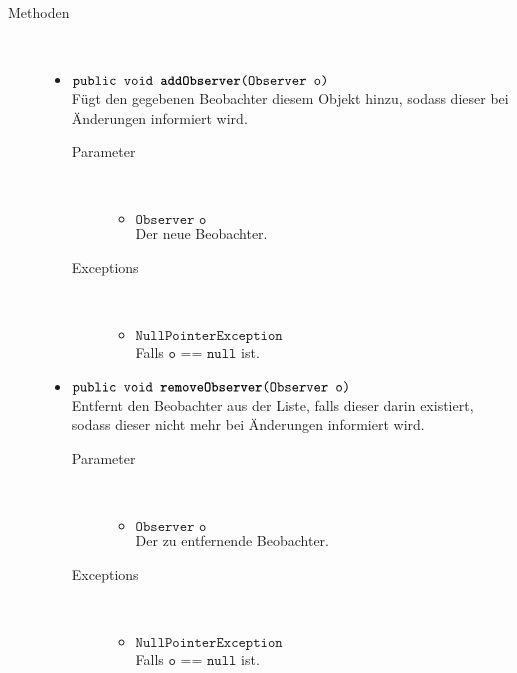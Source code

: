 \begin{description}
\item[Methoden] \hfill \\
	\vspace{-.8cm}
	\begin{itemize}
		\item $\texttt{public void \textbf{addObserver}(Observer o)}$ \\ Fügt den gegebenen Beobachter diesem Objekt hinzu, sodass dieser bei Änderungen informiert wird.
		\begin{description}
			\item[Parameter] \hfill \\
			\vspace{-.8cm}
			\begin{itemize}
				\item $\texttt{Observer o}$ \\ Der neue Beobachter.
			\end{itemize}
			\item[Exceptions] \hfill \\
			\vspace{-.8cm}
			\begin{itemize}
				\item $\texttt{NullPointerException}$ \\ Falls $\texttt{o == null}$ ist.
			\end{itemize}
		\end{description}
		
		\item $\texttt{public void \textbf{removeObserver}(Observer o)}$ \\ Entfernt den Beobachter aus der Liste, falls dieser darin existiert, sodass dieser nicht mehr bei Änderungen informiert wird.
		\begin{description}
			\item[Parameter] \hfill \\
			\vspace{-.8cm}
			\begin{itemize}
				\item $\texttt{Observer o}$ \\ Der zu entfernende Beobachter.
			\end{itemize}
			\item[Exceptions] \hfill \\
			\vspace{-.8cm}
			\begin{itemize}
				\item $\texttt{NullPointerException}$ \\ Falls $\texttt{o == null}$ ist.
			\end{itemize}
		\end{description}
		

\end{itemize}
\end{description}
